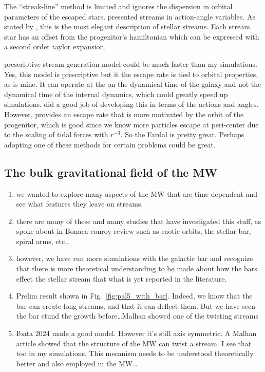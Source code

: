         The ``streak-line'' method is limited and ignores the dispersion in orbital parameters of the escaped stars. \citet{2011MNRAS.413.1852E} presented streams in action-angle variables. As stated by \citet{2015MNRAS.452..301F}, this is the most elegant description of stellar streams. Each stream star has an offset from the progenitor's hamiltonian which can be expressed with a second order taylor expansion. 

        \citet{2015MNRAS.452..301F} prescriptive stream generation model could be much faster than my simulations. Yes, this model is prescriptive but it the escape rate is tied to orbital properties, as is mine. It can operate at the on the dynamical time of the galaxy and not the dynamical time of the internal dynamics, which could greatly speed up simulations. \citet{2014ApJ...795...95B} did a good job of developing this in terms of the actions and angles. However, \citet{2015MNRAS.452..301F} provides an escape rate that is more motivated by the orbit of the progenitor, which is good since we know more particles escape at peri-center due to the scaling of tidal forces with $r^{-3}$. So the Fardal is pretty great. Perhaps adopting one of these methods for certain problems could be great. 





    \subsection{The bulk gravitational field of the MW}

            \begin{enumerate}
                \item we wanted to explore many aspects of the MW that are time-dependent and see what features they leave on streams. 
                \item there are many of these and many studies that have investigated this stuff, as spoke about in Bonaca conroy review such as caotic orbits, the stellar bar, spiral arms, etc,. 
                \item however, we have run more simulations with the galactic bar and recognize that there is more theoretical understanding to be made about how the bars effect the stellar stream that what is yet reported in the literature. 
                \item Prelim result shown in Fig.~\ref{fig:pal5_with_bar}. Indeed, we know that the bar can create long streams, and that it can deflect them. But we have seen the bar stund the growth before\dots Malhan showed one of the twisting streams 
                \item Ibata 2024 made a good model. However it's still axis symmetric. A Malhan article showed that the structure of the MW can twist a stream. I see that too in my simulations. This mecanism needs to be understood theoretically better and also employed in the MW\dots
            \end{enumerate}


